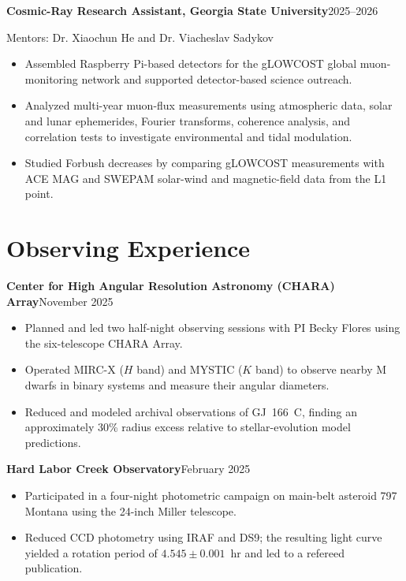 \documentclass[10pt,a4paper]{article}
\newcommand{\entry}[2]{%
  \par\vspace{2pt}%
  \noindent\textbf{#1}\hfill#2\par
}
\newcommand{\cvline}[1]{\noindent#1\par}
\newenvironment{items}
  {\begin{itemize}[leftmargin=1.2em,itemsep=0.6pt,topsep=1.5pt,parsep=0pt,
                   label=\textbullet]}
  {\end{itemize}}
\begin{document}
\entry{Cosmic-Ray Research Assistant, Georgia State University}{2025--2026}
\cvline{Mentors: Dr. Xiaochun He and Dr. Viacheslav Sadykov}
\begin{items}
  \item Assembled Raspberry Pi-based detectors for the gLOWCOST global muon-monitoring
        network and supported detector-based science outreach.
  \item Analyzed multi-year muon-flux measurements using atmospheric data, solar and lunar
        ephemerides, Fourier transforms, coherence analysis, and correlation tests to
        investigate environmental and tidal modulation.
  \item Studied Forbush decreases by comparing gLOWCOST measurements with ACE MAG and
        SWEPAM solar-wind and magnetic-field data from the L1 point.
\end{items}

\section{Observing Experience}

\entry{Center for High Angular Resolution Astronomy (CHARA) Array}{November 2025}
\begin{items}
  \item Planned and led two half-night observing sessions with PI Becky Flores using the
        six-telescope CHARA Array.
  \item Operated MIRC-X ($H$ band) and MYSTIC ($K$ band) to observe nearby M dwarfs in
        binary systems and measure their angular diameters.
  \item Reduced and modeled archival observations of GJ~166~C, finding an approximately
        30\% radius excess relative to stellar-evolution model predictions.
\end{items}

\entry{Hard Labor Creek Observatory}{February 2025}
\begin{items}
  \item Participated in a four-night photometric campaign on main-belt asteroid
        797 Montana using the 24-inch Miller telescope.
  \item Reduced CCD photometry using IRAF and DS9; the resulting light curve yielded a
        rotation period of $4.545 \pm 0.001$~hr and led to a refereed publication.
\end{items}
\end{document}
